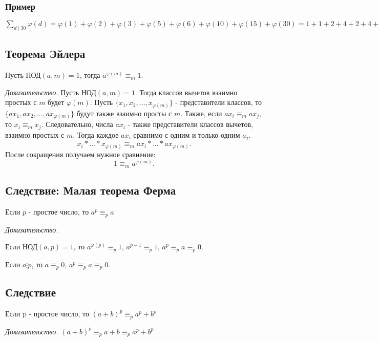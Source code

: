 \documentclass[12pt]{article}
\begin{document}
\subsubsection{Пример} $\displaystyle\sum_{d\mid 30}\varphi(d)=\varphi(1)+\varphi(2)+\varphi(3)+\varphi(5)+\varphi(6)+\varphi(10)+\varphi(15)+\varphi(30)=1+1+2+4+2+4+8+8=30$

\subsection{Теорема Эйлера}
Пусть НОД$(a,m)=1$, тогда $a^{\varphi(m)}\equiv_{m}1.$
\par \textit{Доказательство.} Пусть НОД$(a,m)=1.$ Тогда классов вычетов взаимно простых с $m$ будет $\varphi(m)$. Пусть $\{x_{1},x_{2},\dots,x_{\varphi(m)}\}$ - представители классов, то $\{ax_{1},ax_{2},\dots,ax_{\varphi(m)}\}$ будут также взаимно просты с $m$. Также, если $ax_{i}\equiv_{m} ax_{j}$, то $x_{i}\equiv_{m} x_{j}.$ Следовательно, числа $ax_{i}$ - также представители классов вычетов, взаимно простых с $m$. Тогда каждое $ax_{i}$ сравнимо с одним и только одним $a_{j}$. \[x_{i}*\dots*x_{\varphi(m)}\equiv_{m} ax_{i}*\dots*ax_{\varphi(m)}.\] После сокращения получаем нужное сравнение: \[1\equiv_{m} a^{\varphi(m)}.\]

\subsection{Следствие: Малая теорема Ферма}
Если $p$ - простое число, то $a^{p}\equiv_{p}a$
\par \textit{Доказательство.} 
\par Если НОД$(a,p)=1$, то $a^{\varphi(p)}\equiv_{p}1$, $a^{p-1}\equiv_{p}1$, $a^{p}\equiv_{p}a\equiv_{p}0$. 
\par Если $a\vdots p$, то $a\equiv_{p}0$, $a^{p}\equiv_{p}a\equiv_{p}0$.

\subsection{Следствие}
Если p - простое число, то $(a+b)^{p}\equiv_{p}a^{p}+b^{p}$
\par \textit{Доказательство.} $(a+b)^{p}\equiv_{p}a+b\equiv_{p}a^{p}+b^{p}$
\end{document}
